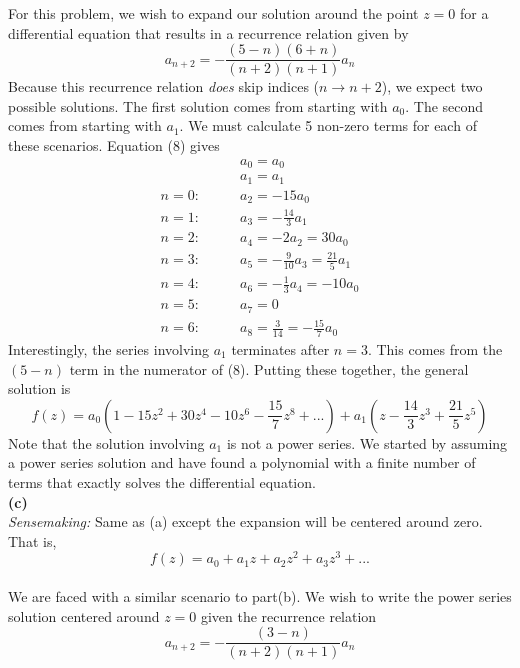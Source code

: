 \documentclass{article}
\begin{document}
\noindent For this problem, we wish to expand our solution around the point
$z=0$ for a differential equation that results in a recurrence relation given by
\begin{equation}
  a_{n+2} = -\frac{(5-n)(6+n)}{(n+2)(n+1)}a_n
\end{equation}
Because this recurrence relation \textit{does} skip indices ($n\to n+2$), we
expect two possible solutions. The first solution comes from starting with
$a_0$. The second comes from starting with $a_1$. We must calculate 5 non-zero
terms for each of these scenarios. Equation (8) gives
\begin{align}
  &\qquad a_0 = a_0 \\
  &\qquad a_1 = a_1 \\
  n=0 :&\qquad a_2=-15a_0 \\
  n=1 :&\qquad a_3= -\frac{14}{3}a_1\\
  n=2 :&\qquad a_4=-2a_2 = 30a_0\\
  n=3 :&\qquad a_5=-\frac{9}{10}a_3= \frac{21}{5}a_1 \\
  n=4 :&\qquad a_6=-\frac{1}{3}a_4 = -10a_0\\
  n=5 :&\qquad a_7=0 \\
  n=6 :&\qquad a_8=\frac{3}{14} = -\frac{15}{7}a_0
\end{align}
Interestingly, the series involving $a_1$ terminates after $n=3$. This comes
from the $(5-n)$ term in the numerator of (8). Putting these together, the
general solution is
\begin{equation}
  f(z) = a_0\left(1-15z^2+30z^4-10z^6-\frac{15}{7}z^8+...\right) + a_1\left(z-\frac{14}{3}z^3+\frac{21}{5}z^5\right)
\end{equation}
Note that the solution involving $a_1$ is not a power series. We started by
assuming a power series solution and have found a polynomial with a finite
number of terms that exactly solves the differential equation. \\






\noindent\textbf{(c)}\\
\noindent \textit{Sensemaking:} Same as (a) except the expansion will be centered
around zero. That is,
\begin{equation}
  f(z) = a_0+a_1z+a_2z^2+a_3z^3+ ...
\end{equation}
\\
We are faced with a similar scenario to part(b). We wish to write the power
series solution centered around $z=0$ given the recurrence relation
\begin{equation}
  a_{n+2}= -\frac{(3-n)}{(n+2)(n+1)}a_n
\end{equation}
\end{document}
